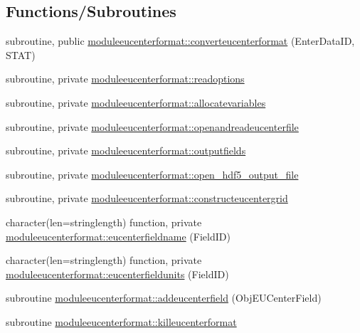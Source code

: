\subsection*{Functions/\+Subroutines}
\begin{DoxyCompactItemize}
\item 
subroutine, public \mbox{\hyperlink{namespacemoduleeucenterformat_aa12d33b733be8e990e1050000343f7ed}{moduleeucenterformat\+::converteucenterformat}} (Enter\+Data\+ID, S\+T\+AT)
\item 
subroutine, private \mbox{\hyperlink{namespacemoduleeucenterformat_a7195020c940588617c0bf9bb335b07f9}{moduleeucenterformat\+::readoptions}}
\item 
subroutine, private \mbox{\hyperlink{namespacemoduleeucenterformat_a363ea37d06e552dd3191189238b401fc}{moduleeucenterformat\+::allocatevariables}}
\item 
subroutine, private \mbox{\hyperlink{namespacemoduleeucenterformat_a82e8b7c6bd570b0435fd58801a248e44}{moduleeucenterformat\+::openandreadeucenterfile}}
\item 
subroutine, private \mbox{\hyperlink{namespacemoduleeucenterformat_afb336c51f13a7459800b82f45a13e498}{moduleeucenterformat\+::outputfields}}
\item 
subroutine, private \mbox{\hyperlink{namespacemoduleeucenterformat_a8e53ba660eb9e964abe2de913b95c20f}{moduleeucenterformat\+::open\+\_\+hdf5\+\_\+output\+\_\+file}}
\item 
subroutine, private \mbox{\hyperlink{namespacemoduleeucenterformat_a95230a7fb149b9fbacb2fdd6d4bc776d}{moduleeucenterformat\+::constructeucentergrid}}
\item 
character(len=stringlength) function, private \mbox{\hyperlink{namespacemoduleeucenterformat_a2270a8364737dc694ff865c8eb8a8788}{moduleeucenterformat\+::eucenterfieldname}} (Field\+ID)
\item 
character(len=stringlength) function, private \mbox{\hyperlink{namespacemoduleeucenterformat_a96acc03f8210b20aa7bb87e45e512333}{moduleeucenterformat\+::eucenterfieldunits}} (Field\+ID)
\item 
subroutine \mbox{\hyperlink{namespacemoduleeucenterformat_ae1108c503ba34758ca91c475847a0a95}{moduleeucenterformat\+::addeucenterfield}} (Obj\+E\+U\+Center\+Field)
\item 
subroutine \mbox{\hyperlink{namespacemoduleeucenterformat_a86566f77f24a79f436c69106f22fe5f7}{moduleeucenterformat\+::killeucenterformat}}
\end{DoxyCompactItemize}
